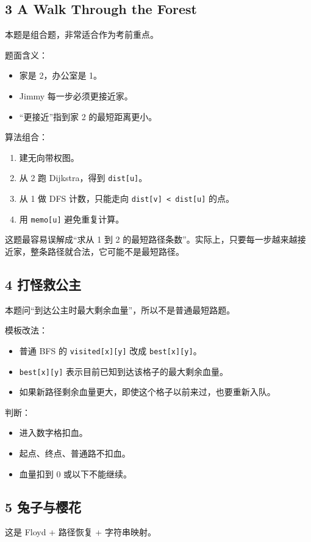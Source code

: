 \documentclass[10pt,a4paper,fontset=none]{ctexart}
\begin{document}
\subsection{3 A Walk Through the Forest}
本题是组合题，非常适合作为考前重点。

题面含义：
\begin{itemize}
  \item 家是 2，办公室是 1。
  \item Jimmy 每一步必须更接近家。
  \item “更接近”指到家 2 的最短距离更小。
\end{itemize}

算法组合：
\begin{enumerate}
  \item 建无向带权图。
  \item 从 2 跑 Dijkstra，得到 \texttt{dist[u]}。
  \item 从 1 做 DFS 计数，只能走向 \texttt{dist[v] < dist[u]} 的点。
  \item 用 \texttt{memo[u]} 避免重复计算。
\end{enumerate}

\begin{warnbox}
这题最容易误解成“求从 1 到 2 的最短路径条数”。实际上，只要每一步越来越接近家，整条路径就合法，它可能不是最短路径。
\end{warnbox}

\subsection{4 打怪救公主}
本题问“到达公主时最大剩余血量”，所以不是普通最短路题。

模板改法：
\begin{itemize}
  \item 普通 BFS 的 \texttt{visited[x][y]} 改成 \texttt{best[x][y]}。
  \item \texttt{best[x][y]} 表示目前已知到达该格子的最大剩余血量。
  \item 如果新路径剩余血量更大，即使这个格子以前来过，也要重新入队。
\end{itemize}

判断：
\begin{itemize}
  \item 进入数字格扣血。
  \item 起点、终点、普通路不扣血。
  \item 血量扣到 0 或以下不能继续。
\end{itemize}

\subsection{5 兔子与樱花}
这是 Floyd + 路径恢复 + 字符串映射。
\end{document}
